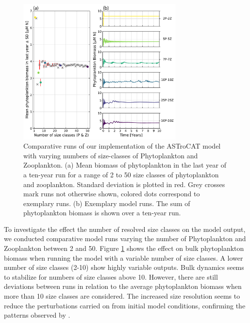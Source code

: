 \documentclass[journal abbreviation, manuscript]{copernicus}
\begin{document}
\begin{figure}[t]
\includegraphics[width=8.3cm]{Figures/firstdraft_plots/03_ASTroCAT_sizeclassrange.pdf}
\caption{Comparative runs of our implementation of the ASTroCAT model with varying numbers of size-classes of Phytoplankton and Zooplankton. (a) Mean biomass of phytoplankton in the last year of a ten-year run for a range of 2 to 50 size classes of phytoplankton and zooplankton. Standard deviation is plotted in red. Grey crosses mark runs not otherwise shown, colored dots correspond to exemplary runs. (b) Exemplary model runs. The sum of phytoplankton biomass is shown over a ten-year run.}
\label{Figure:ResultsASTroCAT_2}
\end{figure}

To investigate the effect the number of resolved size classes on the model output, we conducted comparative model runs varying the number of Phytoplankton and Zooplankton between 2 and 50.
Figure \ref{Figure:ResultsASTroCAT_2} shows the effect on bulk phytoplankton biomass when running the model with a variable number of size classes. A lower number of size classes (2-10) show highly variable outputs. Bulk dynamics seems to stabilize for numbers of size classes above 10. However, there are still deviations between runs in relation to the average phytoplankton biomass when more than 10 size classes are considered. The increased size resolution seems to reduce the perturbations carried on from initial model conditions, confirming the patterns observed by \citet{Baird2010IncreasingErrors}.
\end{document}

